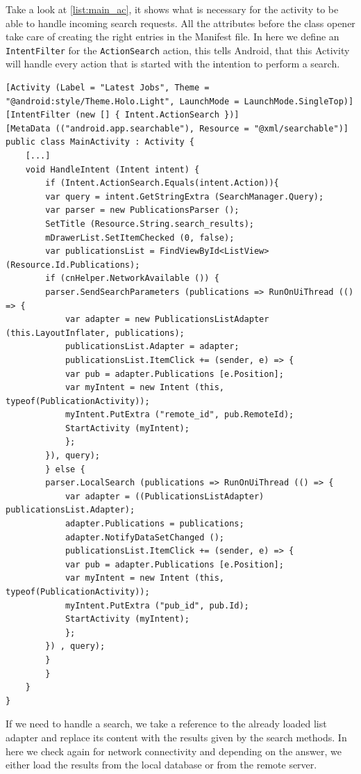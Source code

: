 Take a look at \autoref{list:main_ac}, it shows what is necessary for the activity to be able to handle incoming search requests. All the attributes before the class opener take care of creating the right entries in the Manifest file. In here we define an \texttt{IntentFilter} for the \texttt{ActionSearch} action, this tells Android, that this Activity will handle every action that is started with the intention to perform a search.
\vfill
\begin{lstlisting}[frame=lt,caption=MainActivity.cs, label={list:main_ac}]
[Activity (Label = "Latest Jobs", Theme = "@android:style/Theme.Holo.Light", LaunchMode = LaunchMode.SingleTop)]
[IntentFilter (new [] { Intent.ActionSearch })]
[MetaData (("android.app.searchable"), Resource = "@xml/searchable")]
public class MainActivity : Activity {
	[...]
	void HandleIntent (Intent intent) {
		if (Intent.ActionSearch.Equals(intent.Action)){
		var query = intent.GetStringExtra (SearchManager.Query);
		var parser = new PublicationsParser ();
		SetTitle (Resource.String.search_results);
		mDrawerList.SetItemChecked (0, false);
		var publicationsList = FindViewById<ListView> (Resource.Id.Publications);
		if (cnHelper.NetworkAvailable ()) {
		parser.SendSearchParameters (publications => RunOnUiThread (() => {
			var adapter = new PublicationsListAdapter (this.LayoutInflater, publications);
			publicationsList.Adapter = adapter;
			publicationsList.ItemClick += (sender, e) => {
			var pub = adapter.Publications [e.Position];
			var myIntent = new Intent (this, typeof(PublicationActivity));
			myIntent.PutExtra ("remote_id", pub.RemoteId);
			StartActivity (myIntent);
			};
		}), query);				
		} else {
		parser.LocalSearch (publications => RunOnUiThread (() => {
			var adapter = ((PublicationsListAdapter) publicationsList.Adapter);
			adapter.Publications = publications;
			adapter.NotifyDataSetChanged ();
			publicationsList.ItemClick += (sender, e) => {
			var pub = adapter.Publications [e.Position];
			var myIntent = new Intent (this, typeof(PublicationActivity));
			myIntent.PutExtra ("pub_id", pub.Id);
			StartActivity (myIntent);
			};
		}) , query);
		}			
		}		
	}
}\end{lstlisting}

If we need to handle a search, we take a reference to the already loaded list adapter and replace its content with the results given by the search methods. In here we check again for network connectivity and depending on the answer, we either load the results from the local database or from the remote server.  

